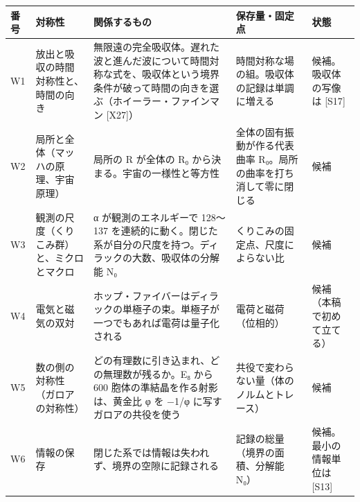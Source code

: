 \documentclass[
  a4paper,
]{ltjsarticle}
\newcounter{none} %
\begin{document}
{\def\LTcaptype{none} %
\begin{longtable}[]{@{}
  >{\raggedright\arraybackslash}p{}
  >{\raggedright\arraybackslash}p{}
  >{\raggedright\arraybackslash}p{}
  >{\raggedright\arraybackslash}p{}
  >{\raggedright\arraybackslash}p{}@{}}
\toprule\noalign{}
\begin{minipage}[b]{\linewidth}\raggedright
番号
\end{minipage} & \begin{minipage}[b]{\linewidth}\raggedright
対称性
\end{minipage} & \begin{minipage}[b]{\linewidth}\raggedright
関係するもの
\end{minipage} & \begin{minipage}[b]{\linewidth}\raggedright
保存量・固定点
\end{minipage} & \begin{minipage}[b]{\linewidth}\raggedright
状態
\end{minipage} \\
\midrule\noalign{}
\endhead
\bottomrule\noalign{}
\endlastfoot
W1 & 放出と吸収の時間対称性と、時間の向き &
無限遠の完全吸収体。遅れた波と進んだ波について時間対称な式を、吸収体という境界条件が破って時間の向きを選ぶ（ホイーラー・ファインマン
{[}X27{]}） & 時間対称な場の組。吸収体の記録は単調に増える &
候補。吸収体の写像は {[}S17{]} \\
W2 & 局所と全体（マッハの原理、宇宙原理） & 局所の R が全体の R₀
から決まる。宇宙の一様性と等方性 & 全体の固有振動が作る代表曲率
R₀。局所の曲率を打ち消して零に閉じる & 候補 \\
W3 & 観測の尺度（くりこみ群）と、ミクロとマクロ & α が観測のエネルギーで
128〜137
を連続的に動く。閉じた系が自分の尺度を持つ。ディラックの大数、吸収体の分解能
N₀ & くりこみの固定点、尺度によらない比 & 候補 \\
W4 & 電気と磁気の双対 &
ホップ・ファイバーはディラックの単極子の束。単極子が一つでもあれば電荷は量子化される
& 電荷と磁荷（位相的） & 候補（本稿で初めて立てる） \\
W5 & 数の側の対称性（ガロアの対称性） &
どの有理数に引き込まれ、どの無理数が残るか。E₈ から 600
胞体の準結晶を作る射影は、黄金比 φ を −1/φ に写すガロアの共役を使う &
共役で変わらない量（体のノルムとトレース） & 候補 \\
W6 & 情報の保存 & 閉じた系では情報は失われず、境界の空隙に記録される &
記録の総量（境界の面積、分解能 N₀） & 候補。最小の情報単位は
{[}S13{]} \\
\end{longtable}
}
\end{document}
